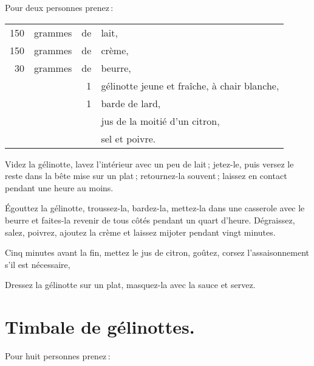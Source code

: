 \smallskip

Pour deux personnes prenez :

\footnotesize
\begin{longtable}{rrrp{16em}}
    150 & grammes & de & lait,                                                                            \\
    150 & grammes & de & crème,                                                                           \\
     30 & grammes & de & beurre,                                                                          \\
        &         &  1 & gélinotte jeune et fraîche, à chair blanche,                                     \\
        &         &  1 & barde de lard,                                                                   \\
        &         &    & jus de la moitié d'un citron,                                                    \\
        &         &    & sel et poivre.                                                                   \\
\end{longtable}
\normalsize

Videz la gélinotte, lavez l'intérieur avec un peu de lait ; jetez-le, puis
versez le reste dans la bête mise sur un plat ; retournez-la souvent ; laissez
en contact pendant une heure au moins.

Égouttez la gélinotte, troussez-la, bardez-la, mettez-la dans une casserole
avec le beurre et faites-la revenir de tous côtés pendant un quart d'heure.
Dégraissez, salez, poivrez, ajoutez la crème et laissez mijoter pendant vingt
minutes.

Cinq minutes avant la fin, mettez le jus de citron, goûtez, corsez
l’assaisonnement s'il est nécessaire,

Dressez la gélinotte sur un plat, masquez-la avec la sauce et servez.

\section*{\centering Timbale de gélinottes.}
{}

Pour huit personnes prenez :

